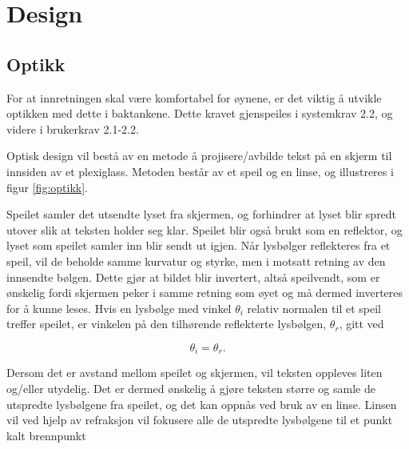 \section{Design}
\label{sec:design}

\subsection{Optikk}


For at innretningen skal være komfortabel for øynene, er det viktig å utvikle optikken med dette i baktankene. Dette kravet gjenspeiles i systemkrav 2.2, og videre i brukerkrav 2.1-2.2.

Optisk design vil bestå av en metode å projisere/avbilde tekst på en skjerm til innsiden av et plexiglass. Metoden består av et speil og en linse, og illustreres i figur \ref{fig:optikk}. 



Speilet samler det utsendte lyset fra skjermen, og forhindrer at lyset blir spredt utover slik at teksten holder seg klar. Speilet blir også brukt som en reflektor, og lyset som speilet samler inn blir sendt ut igjen. Når lysbølger reflekteres fra et speil, vil de beholde samme kurvatur og styrke, men i motsatt retning av den innsendte bølgen. Dette gjør at bildet blir invertert, altså speilvendt, som er ønskelig fordi skjermen peker i samme retning som øyet og må dermed inverteres for å kunne leses. Hvis en lysbølge med vinkel $\theta_i$ relativ normalen til et speil treffer speilet, er vinkelen på den tilhørende reflekterte lysbølgen, $\theta_r$, gitt ved

\begin{equation}
    \theta_i = \theta_r.
\end{equation}


Dersom det er avstand mellom speilet og skjermen, vil teksten oppleves liten og/eller utydelig. Det er dermed ønskelig å gjøre teksten større og samle de utspredte lysbølgene fra speilet, og det kan oppnås ved bruk av en linse. Linsen vil ved hjelp av refraksjon vil fokusere alle de utspredte lysbølgene til et punkt kalt brennpunkt

